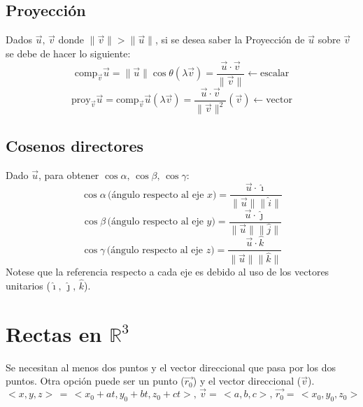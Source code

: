\documentclass[letterpaper, 12pt]{article}
\begin{document}
    \subsection{Proyección}
    Dados \(\vec{u},\,\vec{v}\) donde \(\lVert\vec{v}\rVert>\lVert\vec{u}\rVert\), si se desea saber la Proyección de \(\vec{u}\) sobre \(\vec{v}\) se debe de hacer lo siguiente:
        \[\text{comp}_{\vec{v}}\vec{u}=\lVert\vec{u}\rVert\cos\theta\left(\lambda\vec{v}\right)=\frac{\vec{u}\cdot\vec{v}}{\lVert\vec{v}\rVert}\leftarrow\text{escalar}\]
        \[\text{proy}_{\vec{v}}\vec{u}=\text{comp}_{\vec{v}}\vec{u}\left(\lambda\vec{v}\right)=\frac{\vec{u}\cdot\vec{v}}{\lVert\vec{v}\rVert^2}\left(\vec{v}\right)\leftarrow\text{vector}\]
    \subsection{Cosenos directores}
    Dado \(\vec{u}\), para obtener \(\cos\alpha,\,\cos\beta,\,\cos\gamma\):
    \[\cos\alpha\,\text{(ángulo respecto al eje }x)=\frac{\vec{u}\cdot \hat{\imath}}{\lVert\vec{u}\rVert\lVert\hat{i}\rVert}\]
    \[\cos\beta\,\text{(ángulo respecto al eje }y)=\frac{\vec{u}\cdot \hat{\jmath}}{\lVert\vec{u}\rVert\lVert\hat{j}\rVert}\]
    \[\cos\gamma\,\text{(ángulo respecto al eje }z)=\frac{\vec{u}\cdot \hat{k}}{\lVert\vec{u}\rVert\lVert\hat{k}\rVert}\]
    Notese que la referencia respecto a cada eje es debido al uso de los vectores unitarios (\(\hat{\imath},\,\hat{\jmath},\,\hat{k}\)). 
    \section{Rectas en \(\mathbb{R}^3\)}
    Se necesitan al menos dos puntos y el vector direccional que pasa por los dos puntos. Otra opción puede ser un punto (\(\vec{r_0}\)) y el vector direccional (\(\vec{v}\)).
    \[<\!x,y,z\!>\,=\,<\!x_0+at,y_0+bt,z_0+ct\!>,\, \vec{v}=\,<\!a,b,c\!>,\, \vec{r_0}=\,<\!x_0,y_0,z_0\!>\]
\end{document}
